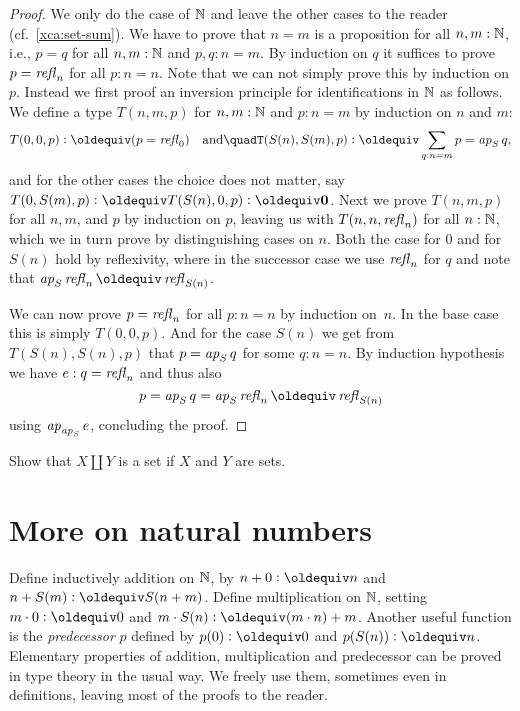 \begin{proof}
  We only do the case of $\mathbb{N}$ and leave the other cases to the reader
  (cf.\ \cref{xca:set-sum}).  We have to prove that $n=m$ is a
  proposition for all $n,m:\mathbb{N}$, i.e., $p = q$ for all $n,m : \mathbb{N}$ and
  $p, q : n = m$.  By induction on $q$ it suffices to prove $p = \mathop{{\it refl}_{n}}$ for all $p : n = n$.  Note that we can not simply prove this by
  induction on $p$.  Instead we first proof an inversion principle for
  identifications in $\mathbb{N}$ as follows.  We define a type $T(n,m,p)$
  for $n, m : \mathbb{N}$ and $p : n = m$ by induction on $n$ and $m$:
  \[
    T(0,0,p) \defeq (p = \refl{0})%
    \quad \text{and} \quad%
    T(S(n), S(m), p) \defeq \sum_{q : n = m} p = \ap S q,%
  \]
  and for the other cases the choice does not matter, say $T(0, S(m),
  p) \defeq T(S(n), 0 ,p) \defeq \bn{0}$.  Next we prove $T(n,m,p)$
  for all $n,m$, and $p$ by induction on $p$, leaving us with
  $T(n,n,\mathop{{\it refl}_{n}})$ for all $n : \mathbb{N}$, which we in turn prove by
  distinguishing cases on $n$.  Both the case for $0$ and for $S(n)$
  hold by reflexivity, where in the successor case we use $\mathop{{\it refl}_{n}}$
  for $q$ and note that $\ap S \refl{n} \jdeq \refl{S(n)}$.

  We can now prove $p = \mathop{{\it refl}_{n}}$ for all $p : n = n$ by induction
  on~$n$.  In the base case this is simply $T(0,0,p)$.  And for the
  case $S(n)$ we get from $T(S(n),S(n),p)$ that $p = \mathop{{\it ap}_{S}} q$ for
  some $q : n = n$.  By induction hypothesis we have $e : q =
  \mathop{{\it refl}_{n}}$ and thus also
  \[
    p = \ap{S} q = \ap{S} \refl{n} \jdeq \refl{S (n)}
  \]
  using $\mathop{{\it ap}_{\mathop{{\it ap}_{S}}}} e$, concluding the proof.
\end{proof}

\begin{xca}\label{xca:set-sum}
Show that $X\amalg Y$ is a set if $X$ and $Y$ are sets.
\end{xca}

\section{More on natural numbers}
\label{sec:more-on-N}

Define inductively addition on $\mathbb{N}$,
by $n+0\defeq n$ and $n+S(m)\defeq S(n+m)$. Define
multiplication on $\mathbb{N}$, setting $m\cdot 0\defeq 0$ and 
$m\cdot S(n)\defeq (m\cdot n) + m$. 
Another useful function is the \emph{predecessor} $p$ defined by
$p(0)\defeq 0$ and $p(S(n))\defeq n$.
Elementary properties of addition, multiplication and predecessor
can be proved in type theory in the usual way.
We freely use them, sometimes even in definitions, leaving most of the
proofs to the reader.

